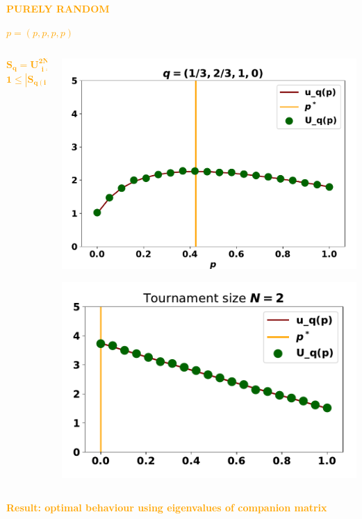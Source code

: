 \documentclass{beamer}
\begin{document}
\begin{frame}
    \begin{center}
    
    \end{center}
\end{frame}

\begin{frame}
    \begin{center}
    \Large{
    \textbf{\textcolor{orange}{PURELY RANDOM}} \vspace{1cm}

    \textcolor{orange}{\boldmath\( p = (p, p, p, p)\)}}
    \end{center}
\end{frame}

\begin{frame}
    \begin{columns}
        \begin{column}{.65\textwidth}
    \Large{\textcolor{orange}{
    \[\mathbf{S_q = U_{\substack{i=1}} ^ {2N} \lambda_i \cup \{0, 1\}}\] \vspace{1mm}
    \[\mathbf{1 \leq|S_{q(i)}| \leq 2N + 2}\]}}
        \end{column}

        \begin{column}{.5\textwidth}
            \vspace{1cm}

            \includegraphics[width=.7\textwidth]{purely_random_match_two}

            \includegraphics[width=.7\textwidth]{purely_random_tournament_one}
        \end{column}
    \end{columns}
    \pause
    \centering
    \vspace{1cm}
    \textbf{\textcolor{orange}{Result: optimal behaviour using eigenvalues of companion matrix}}
\end{frame}
\end{document}
